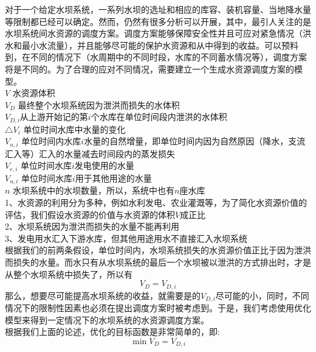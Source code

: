 \documentclass{article}
\begin{document}
对于一个给定水坝系统，一系列水坝的选址和相应的库容、装机容量、当地降水量等限制都已经可以确定。然而，仍然有很多分析可以开展，其中，最引人关注的是水坝系统间水资源的调度方案。调度方案能够保障安全性并且可应对紧急情况（洪水和最小水流量），并且能够尽可能的保护水资源和从中得到的收益。可以预料到，在不同的情况下（水周期中的不同时段，水库的不同蓄水情况等），调度方案将是不同的。为了合理的应对不同情况，需要建立一个生成水资源调度方案的模型。\\

$V$ 水资源体积 \\
$V_{D}$ 最终整个水坝系统因为泄洪而损失的水体积 \\
$V_{D,i}$从上游开始记的第$i$个水库在单位时间段内泄洪的水体积 \\
$\triangle V_{i}$  单位时间水库中水量的变化 \\
$V_{n, i}$ 单位时间内水库$i$水量的自然增量，即单位时间内因为自然原因（降水，支流汇入等）汇入的水量减去时间段内的蒸发损失 \\
$V_{e, i}$ 单位时间水库$i$发电使用的水量 \\
$V_{u, i}$ 单位时间水库$i$用于其他用途的水量 \\
$n$ 水坝系统中的水坝数量，所以，系统中也有$n$座水库 \\


1、水资源的利用分为多种，例如水利发电、农业灌溉等，为了简化水资源价值的评估，我们假设水资源的价值与水资源的体积$V$成正比 \\
2、水坝系统因为泄洪而损失的水量不能再利用 \\
3、发电用水汇入下游水库，但其他用途用水不直接汇入水坝系统 \\

根据我们的前两条假设，单位时间内，水坝系统损失的水资源价值正比于因为泄洪而损失的水量。而水只有从水坝系统的最后一个水坝被以泄洪的方式排出时，才是从整个水坝系统中损失了，所以有
\begin{equation}
V_{D} = V_{D, i}
\end{equation}
那么，想要尽可能提高水坝系统的收益，就需要是的$V_{D, i}$尽可能的小，同时，不同情况下的限制性因素也必须在提出调度方案时被考虑到。于是，我们考虑使用优化模型来得到一定情况下的水坝系统的水资源调度方案。\\

根据我们上面的论述，优化的目标函数是非常简单的，即:
\begin{equation}
\min V_{D} = V_{D, i}
\end{equation}
\end{document}
